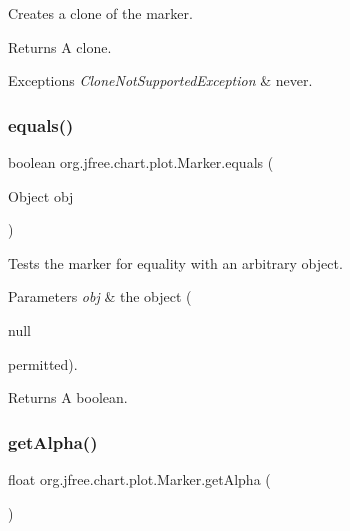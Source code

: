 Creates a clone of the marker.

\begin{DoxyReturn}{Returns}
A clone.
\end{DoxyReturn}

\begin{DoxyExceptions}{Exceptions}
{\em Clone\+Not\+Supported\+Exception} & never. \\
\hline
\end{DoxyExceptions}
\mbox{\label{classorg_1_1jfree_1_1chart_1_1plot_1_1_marker_a74eb2445df6f0af6c1500859c8a69789}} 
\subsubsection{\texorpdfstring{equals()}{equals()}}
{\footnotesize\ttfamily boolean org.\+jfree.\+chart.\+plot.\+Marker.\+equals (\begin{DoxyParamCaption}\item[{Object}]{obj }\end{DoxyParamCaption})}

Tests the marker for equality with an arbitrary object.


\begin{DoxyParams}{Parameters}
{\em obj} & the object (
\begin{DoxyCode}
null 
\end{DoxyCode}
 permitted).\\
\hline
\end{DoxyParams}
\begin{DoxyReturn}{Returns}
A boolean. 
\end{DoxyReturn}
\mbox{\label{classorg_1_1jfree_1_1chart_1_1plot_1_1_marker_a922320b156d95ee82de7a831f03a520c}} 
\subsubsection{\texorpdfstring{get\+Alpha()}{getAlpha()}}
{\footnotesize\ttfamily float org.\+jfree.\+chart.\+plot.\+Marker.\+get\+Alpha (\begin{DoxyParamCaption}{ }\end{DoxyParamCaption})}

